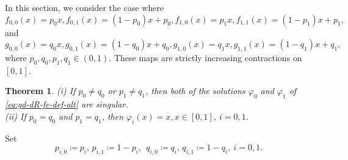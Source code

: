 \documentclass[a4paper, reqno, 11pt]{amsart}
\newtheorem{Thm}{Theorem}[section]
\theoremstyle{definition}
\begin{document}
In this section, 
we consider the case where 
\[ f_{0,0}(x) = p_{0} x, f_{0,1}(x) = (1-p_0) x +p_0, f_{1,0}(x) = p_{1} x, f_{1,1}(x) = (1-p_1) x +p_1, \]
and 
\[ g_{0,0}(x) = q_{0} x, g_{0,1}(x) = (1-q_0) x +q_0, g_{1,0}(x) = q_{1} x, g_{1,1}(x) = (1-q_1) x +q_1, \]
where $p_0, q_0, p_1, q_1 \in (0,1)$. 
These maps are strictly increasing contractions on $[0,1]$. 

\begin{Thm}\label{thm:affine}
(i) If $p_0 \ne q_0$ or $p_1 \ne q_1$, then 
both of the solutions $\varphi_0$ and $\varphi_1$ of  \eqref{eq:gd-dR-fe-def-alt} are singular.\\
(ii) If $p_0 = q_0$ and $p_1 = q_1$, then $\varphi_i (x) = x, x \in [0,1]$, $i = 0,1$. 
\end{Thm}

Set 
\[ p_{i,0} \coloneqq p_i, \, p_{i,1} \coloneqq 1 - p_i, \  \ q_{i,0} \coloneqq q_i, \, q_{i,1} \coloneqq 1 - q_i, \ i = 0,1. \]
\end{document}
